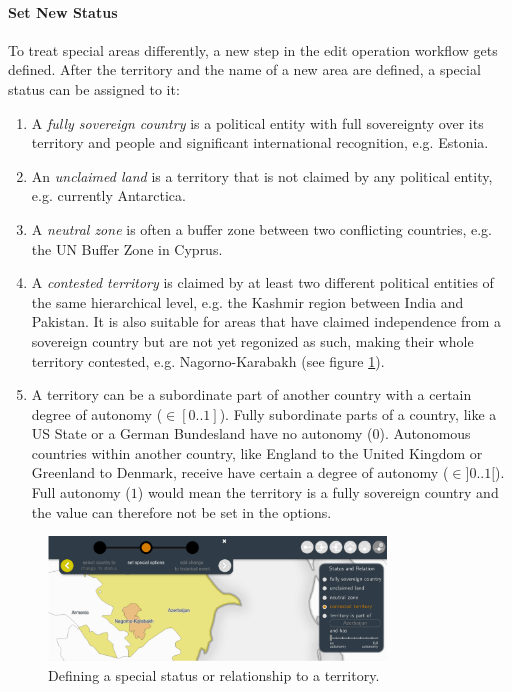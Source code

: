 
\paragraph{Set New Status} %
\label{par:set_new_status}

To treat special areas differently, a new step in the edit operation workflow gets defined. After the territory and the name of a new area are defined, a special status can be assigned to it:

\begin{enumerate}
  \item A \emph{fully sovereign country} is a political entity with full sovereignty over its territory and people and significant international recognition, e.g. Estonia.
  \item An \emph{unclaimed land} is a territory that is not claimed by any political entity, e.g. currently Antarctica.
  \item A \emph{neutral zone} is often a buffer zone between two conflicting countries, e.g. the UN Buffer Zone in Cyprus.
  \item A \emph{contested territory} is claimed by at least two different political entities of the same hierarchical level, e.g. the Kashmir region between India and Pakistan. It is also suitable for areas that have claimed independence from a sovereign country but are not yet regonized as such, making their whole territory contested, e.g. Nagorno-Karabakh (see figure \ref{fig:uncertainty_new_status_tool}).
  \item A territory can be a subordinate part of another country with a certain degree of autonomy ($\in [0..1]$). Fully subordinate parts of a country, like a US State or a German Bundesland have no autonomy ($0$). Autonomous countries within another country, like England to the United Kingdom or Greenland to Denmark, receive have certain a degree of autonomy ($\in ]0..1[$). Full autonomy ($1$) would mean the territory is a fully sovereign country and the value can therefore not be set in the options.
\end{enumerate}

\begin{figure}[ht]
  \centering
  \includegraphics[width = 0.8\textwidth]{graphics/uncertainty/new_status_tool}
  \caption{Defining a special status or relationship to a territory.}
  \label{fig:uncertainty_new_status_tool}
\end{figure}

